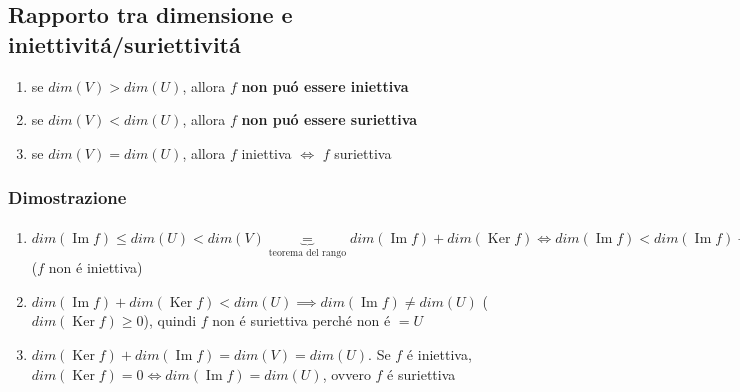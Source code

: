 \documentclass{article}
\DeclareMathOperator{\Ker}{Ker}
\DeclareMathOperator{\Ima}{Im}
\begin{document}
\subsection{Rapporto tra dimensione e iniettivitá/suriettivitá}
\begin{enumerate}
	\item se $dim(V) > dim(U)$, allora $f$ \textbf{non puó essere iniettiva}
	\item se $dim(V) < dim(U)$, allora $f$ \textbf{non puó essere suriettiva}
	\item se $dim(V) = dim(U)$, allora $f$ iniettiva $\iff$ $f$ suriettiva 
\end{enumerate}

\subsubsection{Dimostrazione}
\begin{enumerate}
	\item $dim(\Ima{f}) \le dim(U) < dim(V) \underbrace{=}_{\mbox{teorema del rango}} dim(\Ima{f}) + dim(\Ker{f}) \iff dim(\Ima{f}) < dim(\Ima{f}) + dim(\Ker{f}) \iff dim(\Ker{f})> 0 \implies \Ker{f} \ne \{\vec{0}\}$ ($f$ non é iniettiva)
	\item $dim(\Ima{f}) + dim(\Ker{f}) < dim(U) \implies dim(\Ima{f}) \ne dim(U)$ ($dim(\Ker{f}) \ge 0$), quindi $f$ non é suriettiva perché non é $=U$
	\item $dim(\Ker{f}) + dim(\Ima{f}) = dim(V) = dim(U)$. Se $f$ é iniettiva, $dim(\Ker{f}) = 0 \iff dim(\Ima{f}) = dim(U)$, ovvero $f$ é suriettiva
\end{enumerate}
\end{document}
